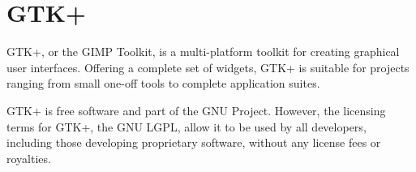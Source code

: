 
\section[GTK+]{GTK+\cite{website:gtk}}\label{sec:Gtk}


GTK+, or the GIMP Toolkit, is a multi-platform toolkit for creating graphical user interfaces. Offering a complete set of widgets, GTK+ is suitable for projects ranging from small one-off tools to complete application suites.

GTK+ is free software and part of the GNU Project. However, the licensing terms for GTK+, the GNU LGPL, allow it to be used by all developers, including those developing proprietary software, without any license fees or royalties.

